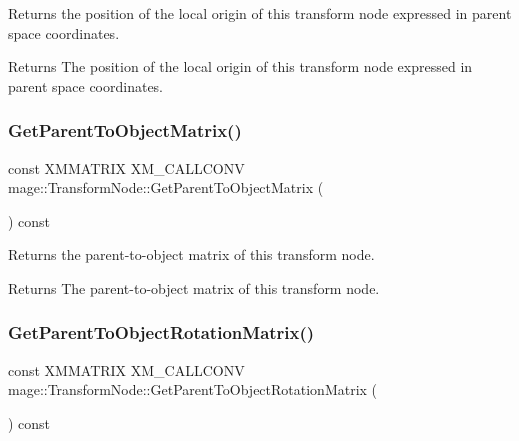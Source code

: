 Returns the position of the local origin of this transform node expressed in parent space coordinates.

\begin{DoxyReturn}{Returns}
The position of the local origin of this transform node expressed in parent space coordinates. 
\end{DoxyReturn}
\hypertarget{classmage_1_1_transform_node_ae707a161018d7018ec989ddb1a821962}{}\label{classmage_1_1_transform_node_ae707a161018d7018ec989ddb1a821962} 
\subsubsection{\texorpdfstring{Get\+Parent\+To\+Object\+Matrix()}{GetParentToObjectMatrix()}}
{\footnotesize\ttfamily const X\+M\+M\+A\+T\+R\+IX X\+M\+\_\+\+C\+A\+L\+L\+C\+O\+NV mage\+::\+Transform\+Node\+::\+Get\+Parent\+To\+Object\+Matrix (\begin{DoxyParamCaption}{ }\end{DoxyParamCaption}) const\hspace{0.3cm}{\ttfamily [noexcept]}}

Returns the parent-\/to-\/object matrix of this transform node.

\begin{DoxyReturn}{Returns}
The parent-\/to-\/object matrix of this transform node. 
\end{DoxyReturn}
\hypertarget{classmage_1_1_transform_node_a3d4a7607234c65bd2914749f9bd1edbe}{}\label{classmage_1_1_transform_node_a3d4a7607234c65bd2914749f9bd1edbe} 
\subsubsection{\texorpdfstring{Get\+Parent\+To\+Object\+Rotation\+Matrix()}{GetParentToObjectRotationMatrix()}}
{\footnotesize\ttfamily const X\+M\+M\+A\+T\+R\+IX X\+M\+\_\+\+C\+A\+L\+L\+C\+O\+NV mage\+::\+Transform\+Node\+::\+Get\+Parent\+To\+Object\+Rotation\+Matrix (\begin{DoxyParamCaption}{ }\end{DoxyParamCaption}) const\hspace{0.3cm}{\ttfamily [noexcept]}}

